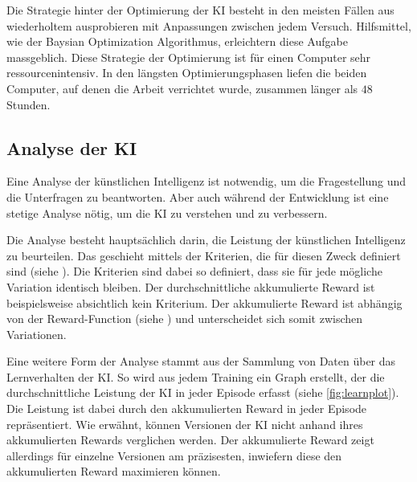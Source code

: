 Die Strategie hinter der Optimierung der KI besteht in den meisten Fällen aus
wiederholtem ausprobieren mit Anpassungen zwischen jedem Versuch. Hilfsmittel,
wie der Baysian Optimization Algorithmus, erleichtern diese Aufgabe massgeblich.
Diese Strategie der Optimierung ist für einen Computer sehr ressourcenintensiv.
In den längsten Optimierungsphasen liefen die beiden Computer, auf denen die
Arbeit verrichtet wurde, zusammen länger als $48$ Stunden.
 
\subsection{Analyse der KI}\label{sub:d_reflex_analys}
Eine Analyse der künstlichen Intelligenz ist notwendig, um die Fragestellung und die
Unterfragen zu beantworten. Aber auch während der Entwicklung ist eine
stetige Analyse nötig, um die KI zu verstehen und zu verbessern.
 
Die Analyse besteht hauptsächlich darin, die Leistung der künstlichen
Intelligenz zu beurteilen. Das geschieht mittels der Kriterien, die für diesen
Zweck definiert sind (siehe ). Die Kriterien sind dabei so
definiert, dass sie für jede mögliche Variation identisch bleiben. Der
durchschnittliche akkumulierte Reward ist beispielsweise absichtlich kein
Kriterium. Der akkumulierte Reward ist abhängig von der Reward-Function (siehe
) und unterscheidet sich somit zwischen Variationen.
 
Eine weitere Form der Analyse stammt aus der Sammlung von Daten über das
Lernverhalten der KI. So wird aus jedem Training ein Graph erstellt, der die
durchschnittliche Leistung der KI in jeder Episode erfasst (siehe
\autoref{fig:learnplot}). Die Leistung ist dabei durch den akkumulierten Reward
in jeder Episode repräsentiert. Wie erwähnt, können Versionen der KI nicht
anhand ihres akkumulierten Rewards verglichen werden. Der akkumulierte Reward
zeigt allerdings für einzelne Versionen am präzisesten, inwiefern diese den
akkumulierten Reward maximieren können.

